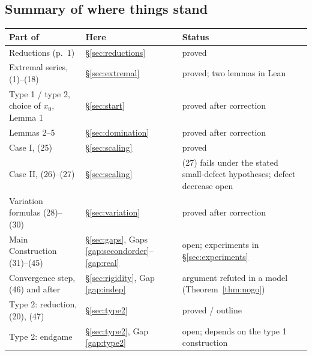 \subsection*{Summary of where things stand}
\begin{center}
\small
\begin{tabularx}{\textwidth}{@{}>{\raggedright\arraybackslash}p{}
>{\raggedright\arraybackslash}p{}>{\raggedright\arraybackslash}X@{}}
\toprule
Part of \paper{} & Here & Status\\
\midrule
Reductions (p.~1) & \S\ref{sec:reductions} & proved\\
Extremal series, (1)--(18) & \S\ref{sec:extremal} & proved; two lemmas in Lean\\
Type 1 / type 2, choice of $x_0$, Lemma 1 & \S\ref{sec:start} & proved after correction\\
Lemmas 2--5 & \S\ref{sec:domination} & proved after correction\\
Case I, (25) & \S\ref{sec:scaling} & proved\\
Case II, (26)--(27) & \S\ref{sec:scaling} & (27) fails under the stated small-defect hypotheses; defect decrease open\\
Variation formulas (28)--(30) & \S\ref{sec:variation} & proved after correction\\
Main Construction (31)--(45) & \S\ref{sec:gaps}, Gaps \ref{gap:secondorder}--\ref{gap:real} & open; experiments in \S\ref{sec:experiments}\\
Convergence step, (46) and after & \S\ref{sec:rigidity}, Gap \ref{gap:indep} & argument refuted in a model (Theorem~\ref{thm:nogo})\\
Type 2: reduction, (20), (47) & \S\ref{sec:type2} & proved / outline\\
Type 2: endgame & \S\ref{sec:type2}, Gap \ref{gap:type2} & open; depends on the type 1 construction\\
\bottomrule
\end{tabularx}
\end{center}
